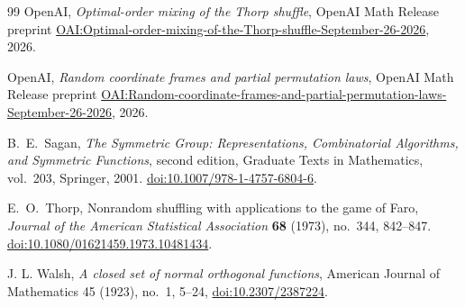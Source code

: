 \begin{thebibliography}{99}
OpenAI,
\emph{Optimal-order mixing of the Thorp shuffle},
OpenAI Math Release preprint
\href{https://github.com/openai/math/blob/main/preprints/Optimal-order-mixing-of-the-Thorp-shuffle-September-26-2026/paper.pdf}{OAI:Optimal-order-mixing-of-the-Thorp-shuffle-September-26-2026},
2026.

OpenAI,
\emph{Random coordinate frames and partial permutation laws},
OpenAI Math Release preprint
\href{https://github.com/openai/math/blob/main/preprints/Random-coordinate-frames-and-partial-permutation-laws-September-26-2026/main.pdf}{OAI:Random-coordinate-frames-and-partial-permutation-laws-September-26-2026},
2026.

B.~E.~Sagan,
\emph{The Symmetric Group: Representations, Combinatorial Algorithms,
and Symmetric Functions}, second edition,
Graduate Texts in Mathematics, vol.~203, Springer, 2001.
\href{https://doi.org/10.1007/978-1-4757-6804-6}
{doi:10.1007/978-1-4757-6804-6}.

E.~O.~Thorp,
Nonrandom shuffling with applications to the game of Faro,
\emph{Journal of the American Statistical Association} \textbf{68}
(1973), no.~344, 842--847.
\href{https://doi.org/10.1080/01621459.1973.10481434}
{doi:10.1080/01621459.1973.10481434}.

J. L. Walsh, \emph{A closed set of normal orthogonal functions},
American Journal of Mathematics 45 (1923), no.~1, 5--24,
\href{https://doi.org/10.2307/2387224}{doi:10.2307/2387224}.

\end{thebibliography}
